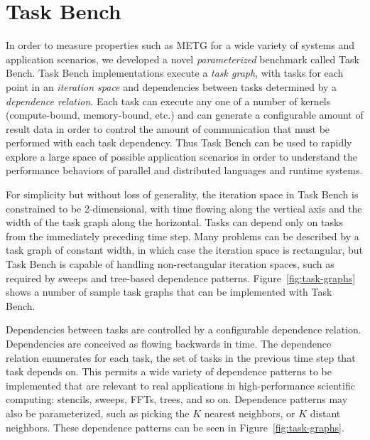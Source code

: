 \section{Task Bench}
\label{sec:task-bench}

In order to measure properties such as METG for a wide variety of
systems and application scenarios, we developed a novel
\emph{parameterized} benchmark called Task Bench. Task Bench
implementations execute a \emph{task graph}, with tasks for each point
in an \emph{iteration space} and dependencies between tasks determined
by a \emph{dependence relation}. Each task can execute any one of a
number of kernels (compute-bound, memory-bound, etc.) and can generate
a configurable amount of result data in order to control the amount of
communication that must be performed with each task dependency. Thus Task Bench can be used to
rapidly explore a large space of possible application scenarios in
order to understand the performance behaviors of parallel and
distributed languages and runtime systems.

For simplicity but without loss of generality, the iteration space in
Task Bench is constrained to be 2-dimensional, with time flowing along
the vertical axis and the width of the task graph along the
horizontal. Tasks can depend only on tasks from the immediately
preceding time step. Many problems can be described by a task graph of
constant width, in which case the iteration space is rectangular, but
Task Bench is capable of handling non-rectangular iteration spaces,
such as required by sweeps and tree-based dependence
patterns. Figure~\ref{fig:task-graphs} shows a number of sample task
graphs that can be implemented with Task Bench.


Dependencies between tasks are controlled by a configurable dependence
relation. Dependencies are conceived as flowing backwards in time. The
dependence relation enumerates for each task, the set of tasks in the
previous time step that task depends on. This permits a wide variety
of dependence patterns to be implemented that are relevant to real
applications in high-performance scientific computing: stencils,
sweeps, FFTs, trees, and so on. Dependence patterns may also be
parameterized, such as picking the $K$ nearest neighbors, or $K$
distant neighbors. These dependence patterns can be seen in
Figure~\ref{fig:task-graphs}.


